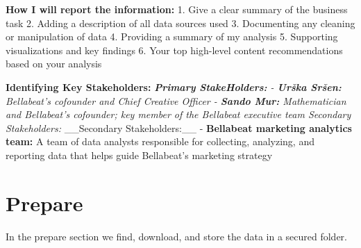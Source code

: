 \documentclass[
]{article}
\begin{document}
\textbf{How I will report the information:} 1. Give a clear summary of
the business task 2. Adding a description of all data sources used 3.
Documenting any cleaning or manipulation of data 4. Providing a summary
of my analysis 5. Supporting visualizations and key findings 6. Your top
high-level content recommendations based on your analysis

\textbf{Identifying Key Stakeholders:} \emph{\textbf{Primary
StakeHolders:} - \textbf{Urška Sršen:} Bellabeat's cofounder and Chief
Creative Officer - \textbf{Sando Mur:} Mathematician and Bellabeat's
cofounder; key member of the Bellabeat executive team Secondary
Stakeholders: }\_\_Secondary Stakeholders:\_\_ - \textbf{Bellabeat
marketing analytics team:} A team of data analysts responsible for
collecting, analyzing, and reporting data that helps guide Bellabeat's
marketing strategy

\hypertarget{prepare}{%
\section{\texorpdfstring{\textbf{Prepare}}{Prepare}}\label{prepare}}

In the prepare section we find, download, and store the data in a
secured folder.
\end{document}
